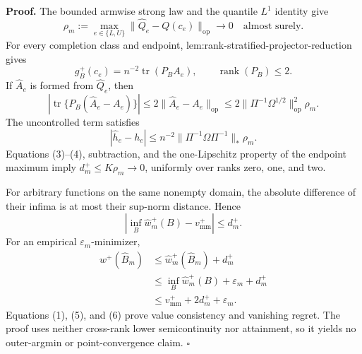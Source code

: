 \textbf{Proof.}
The bounded armwise strong law and the quantile \(L^1\) identity give
\[
\rho_m:=\max_{e\in\{L,U\}}
\lVert\widehat Q_e-Q(c_e)\rVert_{\mathrm{op}}\longrightarrow0
\quad\text{almost surely}.
\tag{1}
\]
For every completion class and endpoint, lem:rank-stratified-projector-reduction gives
\[
g_B^+(c_e)=n^{-2}\operatorname{tr}(P_BA_e),
\qquad \operatorname{rank}(P_B)\le2.
\tag{2}
\]
If \(\widehat A_e\) is formed from \(\widehat Q_e\), then
\[
|\operatorname{tr}\{P_B(\widehat A_e-A_e)\}|
\le2\lVert\widehat A_e-A_e\rVert_{\mathrm{op}}
\le2\lVert\Pi^{-1}\Omega^{1/2}\rVert_{\mathrm{op}}^2\rho_m.
\tag{3}
\]
The uncontrolled term satisfies
\[
|\widehat h_e-h_e|
\le n^{-2}\lVert\Pi^{-1}\Omega\Pi^{-1}\rVert_*\rho_m.
\tag{4}
\]
Equations (3)--(4), subtraction, and the one-Lipschitz property of the endpoint maximum imply \(d_m^+\le K\rho_m\to0\), uniformly over ranks zero, one, and two.

For arbitrary functions on the same nonempty domain, the absolute difference of their infima is at most their sup-norm distance.  Hence
\[
\left|\inf_B\widehat w_m^+(B)-v_{\mathrm{mm}}^+\right|\le d_m^+.
\tag{5}
\]
For an empirical \(\varepsilon_m\)-minimizer,
\[
\begin{aligned}
w^+(\widehat B_m)
&\le\widehat w_m^+(\widehat B_m)+d_m^+\\
&\le\inf_B\widehat w_m^+(B)+\varepsilon_m+d_m^+\\
&\le v_{\mathrm{mm}}^++2d_m^++\varepsilon_m.
\end{aligned}
\tag{6}
\]
Equations (1), (5), and (6) prove value consistency and vanishing regret.  The proof uses neither cross-rank lower semicontinuity nor attainment, so it yields no outer-argmin or point-convergence claim. \(\square\)